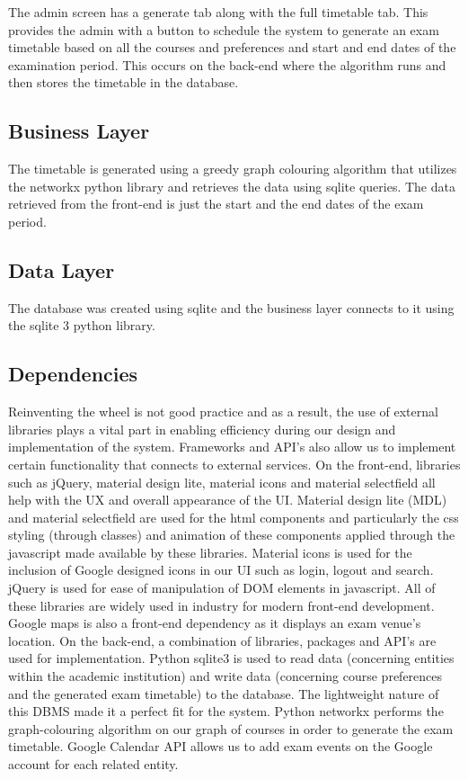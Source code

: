 The admin screen has a generate tab along with the full timetable tab. This provides the admin with a button to schedule the system to generate an exam timetable based on all the courses and preferences and start and end dates of the examination period. This occurs on the back-end where the algorithm runs and then stores the timetable in the database.

\subsection{Business Layer}

The timetable is generated using a greedy graph colouring algorithm that utilizes the networkx python library and retrieves the data using sqlite queries. The data retrieved from the front-end is just the start and the end dates of the exam period. 


\subsection{Data Layer}

The database was created using sqlite and the business layer connects to it using the sqlite 3 python library.

\subsection{Dependencies}

Reinventing the wheel is not good practice and as a result, the use of external libraries plays a vital part in enabling efficiency during our design and implementation of the system. Frameworks and API’s also allow us to implement certain functionality that connects to external services.
On the front-end, libraries such as jQuery, material design lite, material icons and material selectfield all help with the UX and overall appearance of the UI. Material design lite (MDL) and material selectfield are used for the html components and particularly the css styling (through classes) and animation of these components applied through the javascript made available by these libraries. Material icons is used for the inclusion of Google designed icons in our UI such as login, logout and search. jQuery is used for ease of manipulation of DOM elements in javascript. All of these libraries are widely used in industry for modern front-end development. Google maps is also a front-end dependency as it displays an exam venue’s location.
On the back-end, a combination of libraries, packages and API’s are used for implementation. Python sqlite3 is used to read data (concerning entities within the academic institution) and write data (concerning course preferences and the generated exam timetable) to the database. The lightweight nature of this DBMS made it a perfect fit for the system. Python networkx performs the graph-colouring algorithm on our graph of courses in order to generate the exam timetable. Google Calendar API allows us to add exam events on the Google account for each related entity.


